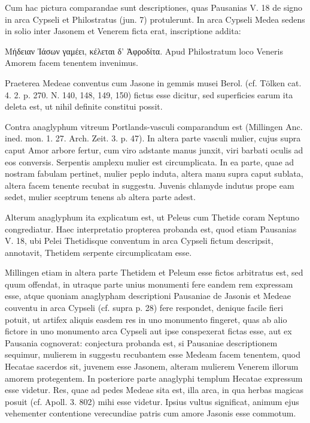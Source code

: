 \documentclass[landscape, a4paper, 11pt, oneside, polutonikogreek, german]{article}
\begin{document}
Cum hac pictura comparandae sunt descriptiones, quas Pausanias V. 18 de signo in arca Cypseli et Philostratus (jun. 7) protulerunt. In arca Cypseli Medea sedens in solio inter Jasonem et Venerem ficta erat, inscriptione addita:

Μήδειαν Ἰάσων γαμέει, κέλεται δ' Ἀφροδίτα. Apud Philostratum loco Veneris Amorem facem tenentem invenimus.

Praeterea Medeae conventus cum Jasone in gemmis musei Berol. (cf. Tölken cat. 4. 2. p. 270. N. 140, 148, 149, 150) fictus esse dicitur, sed superficies earum ita deleta est, ut nihil definite constitui possit.

Contra anaglyphum vitreum Portlands-vasculi comparandum est (Millingen Anc. ined. mon. 1. 27. Arch. Zeit. 3. p. 47). In altera parte vasculi mulier, cujus supra caput Amor arbore fertur, cum viro adstante manus junxit, viri barbati oculis ad eos conversis. Serpentis amplexu mulier est circumplicata. In ea parte, quae ad nostram fabulam pertinet, mulier peplo induta, altera manu supra caput sublata, altera facem tenente recubat in suggestu. Juvenis chlamyde indutus prope eam sedet, mulier sceptrum tenens ab altera parte adest.

Alterum anaglyphum ita explicatum est, ut Peleus cum Thetide coram Neptuno congrediatur. Haec interpretatio propterea probanda est, quod etiam Pausanias V. 18, ubi Pelei Thetidisque conventum in arca Cypseli fictum descripsit, annotavit, Thetidem serpente circumplicatam esse.

Millingen etiam in altera parte Thetidem et Peleum esse fictos arbitratus est, sed quum offendat, in utraque parte unius monumenti fere eandem rem expressam esse, atque quoniam anaglypham descriptioni Pausaniae de Jasonis et Medeae couventu in arca Cypseli (cf. supra p. 28) fere respondet, denique facile fieri potuit, ut artifex aliquis easdem res in uno monumento fingeret, quas ab alio fictore in uno monumento arca Cypseli aut ipse conspexerat fictas esse, aut ex Pausania cognoverat: conjectura probanda est, si Pausaniae descriptionem sequimur, mulierem in suggestu recubantem esse Medeam facem tenentem, quod Hecatae sacerdos sit, juvenem esse Jasonem, alteram mulierem Venerem illorum amorem protegentem. In posteriore parte anaglyphi templum Hecatae expressum esse videtur. Res, quae ad pedes Medeae sita est, illa arca, in qua herbas magicas posuit (cf. Apoll. 3. 802) mihi esse videtur. Ipsius vultus significat, animum ejus vehementer contentione verecundiae patris cum amore Jasonis esse commotum.
\end{document}
